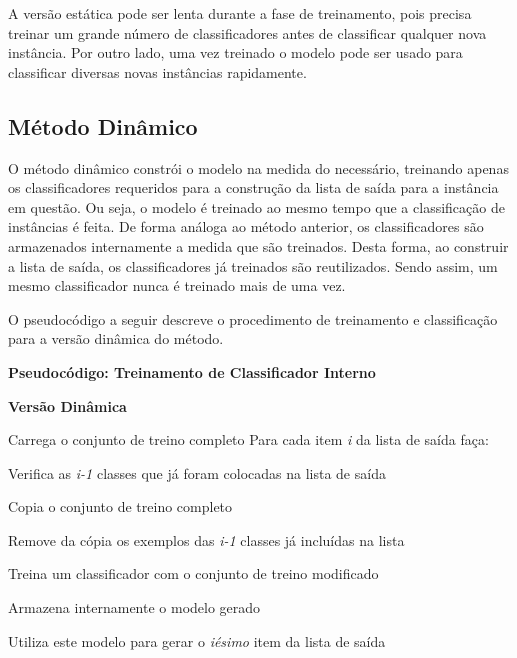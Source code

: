 A versão estática pode ser lenta durante a fase de treinamento, pois precisa treinar um grande número de classificadores antes de classificar qualquer nova instância. Por outro lado, uma vez treinado o modelo pode ser usado para classificar diversas novas instâncias rapidamente.

\subsection{Método Dinâmico}

O método dinâmico constrói o modelo na medida do necessário, treinando apenas os classificadores requeridos para a construção da lista de saída para a instância em questão. Ou seja, o modelo é treinado ao mesmo tempo que a classificação de instâncias é feita. De forma análoga ao método anterior, os classificadores são armazenados internamente a medida que são treinados. Desta forma, ao construir a lista de saída, os classificadores já treinados são reutilizados. Sendo assim, um mesmo classificador nunca é treinado mais de uma vez. 

O pseudocódigo a seguir descreve o procedimento de treinamento e classificação para a versão dinâmica do método.
\\

\hline
\begin{center}
\textbf{Pseudocódigo: Treinamento de Classificador Interno}

\textbf{Versão Dinâmica}
\end{center}
\hline
\hfill \break
Carrega o conjunto de treino completo\newline
Para cada item \textit{i} da lista de saída faça:

\quad Verifica as \textit{i-1} classes que já foram colocadas na lista de saída

\quad Copia o conjunto de treino completo

\quad Remove da cópia os exemplos das \textit{i-1} classes já incluídas na lista

\quad Treina um classificador com o conjunto de treino modificado

\quad Armazena internamente o modelo gerado

\quad Utiliza este modelo para gerar o \textit{iésimo} item da lista de saída
\hline
\hfill \break

